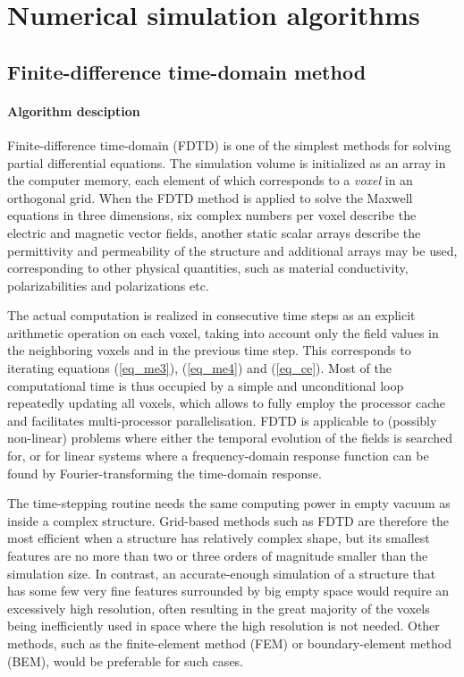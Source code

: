 \section{Numerical simulation algorithms} \label{chapter_numerical}
\subsection{Finite-difference time-domain method}
\paragraph{Algorithm desciption} %
Finite-difference time-domain (FDTD) is one of the simplest methods for solving partial differential equations. The simulation volume is initialized as an array in the computer memory, each element of which corresponds to a \textit{voxel} in an orthogonal grid. When the FDTD method is applied to solve the Maxwell equations in three dimensions, six complex numbers per voxel describe the electric and magnetic vector fields, another static scalar arrays describe the permittivity and permeability of the structure and additional arrays may be used, corresponding to other physical quantities, such as material conductivity, polarizabilities and polarizations etc. 

The actual computation is realized in consecutive time steps as an explicit arithmetic operation on each voxel, taking into account only the field values in the neighboring voxels and in the previous time step. This corresponds to iterating equations (\ref{eq_me3}), (\ref{eq_me4}) and (\ref{eq_ce}). %
Most of the computational time is thus occupied by a simple and unconditional loop repeatedly updating all voxels, which allows to fully employ the processor cache and facilitates multi-processor parallelisation. FDTD is applicable to (possibly non-linear) problems where either the temporal evolution of the fields is searched for, or for linear systems where a frequency-domain response function can be found by Fourier-transforming the time-domain response. 

The time-stepping routine needs the same computing power in empty vacuum as inside a complex structure. Grid-based methods such as FDTD are therefore the most efficient when a structure has relatively complex shape, but its smallest features are no more than two or three orders of magnitude smaller than the simulation size. In contrast, an accurate-enough simulation of a structure that has some few very fine features surrounded by big empty space would require an excessively high resolution, often resulting in the great majority of the voxels being inefficiently used in space where the high resolution is not needed. Other methods, %
such as the finite-element method (FEM) or boundary-element method (BEM), would be preferable for such cases.


